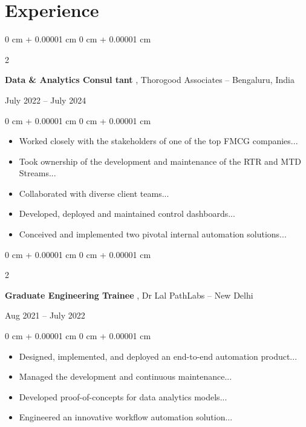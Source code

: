 \documentclass[10pt, letterpaper]{article}
\newenvironment{highlights}{
      \begin{itemize}[
          topsep=0.10 cm,
          parsep=0.10 cm,
          partopsep=0pt,
          itemsep=0pt,
          leftmargin=0 cm + 10pt
      ]
  }{
      \end{itemize}
  } %
\newenvironment{onecolentry}{
    \begin{adjustwidth}{
        0 cm + 0.00001 cm
    }{
        0 cm + 0.00001 cm
    }
  }{
      \end{adjustwidth}
  } %
\newenvironment{twocolentry}[2][]{
      \onecolentry
      \def\secondColumn{#2}
      \setcolumnwidth{\fill, 4.5 cm}
      \begin{paracol}{2}
  }{
      \switchcolumn \raggedleft \secondColumn
      \end{paracol}
      \endonecolentry
  }
\begin{document}
  \section{Experience} 
    
    \begin{twocolentry}{ July 2022 -- July 2024 }
        \textbf{ Data \& Analytics Consul  tant }, Thorogood Associates -- Bengaluru, India
    \end{twocolentry}

    \vspace{0.10 cm}
    \begin{onecolentry}
    \begin{highlights}
    
        \item Worked closely with the stakeholders of one of the top FMCG companies...
    
        \item Took ownership of the development and maintenance of the RTR and MTD Streams...
    
        \item Collaborated with diverse client teams...
    
        \item Developed, deployed and maintained control dashboards...
    
        \item Conceived and implemented two pivotal internal automation solutions...
    
    \end{highlights}
    \end{onecolentry}
    \vspace{0.2 cm}
    
    \begin{twocolentry}{ Aug 2021 -- July 2022 }
        \textbf{ Graduate Engineering Trainee }, Dr Lal PathLabs -- New Delhi
    \end{twocolentry}

    \vspace{0.10 cm}
    \begin{onecolentry}
    \begin{highlights}
    
        \item Designed, implemented, and deployed an end-to-end automation product...
    
        \item Managed the development and continuous maintenance...
    
        \item Developed proof-of-concepts for data analytics models...
    
        \item Engineered an innovative workflow automation solution...
    
    \end{highlights}
    \end{onecolentry}
    \vspace{0.2 cm}
    
\end{document}
